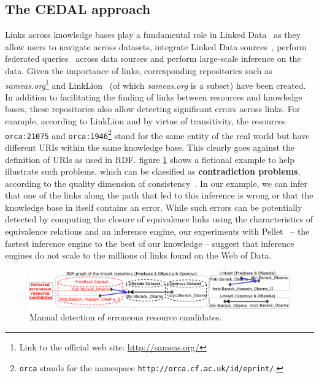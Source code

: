 \subsection{The CEDAL approach}
Links across knowledge bases play a fundamental role in Linked Data~\cite{Albertoni:2013:ALQ:2457317.2457327} as they  allow users to navigate across datasets, integrate Linked Data sources~\cite{NgomoSL14}, perform federated queries~\cite{saleem2013daw} across data sources and perform large-scale inference on the data.
Given the importance of links, corresponding repositories such as \emph{sameas.org}\footnote{Link to the official web site: \url{http://sameas.org/}} and LinkLion~\cite{nentwig2014linklion} (of which \emph{sameas.org} is a subset) have been created. 
In addition to facilitating the finding of links between  resources and knowledge bases, these repositories also allow detecting significant errors across links. 
For example, according to LinkLion and by virtue of transitivity, the resources \texttt{orca:21075} and \texttt{orca:1946}\footnote{\texttt{orca} stands for the namespace \texttt{http://orca.cf.ac.uk/id/eprint/}.} stand for the same entity of the real world but have different URIs within the same knowledge base. 
This clearly goes against the definition of URIs as used in RDF. 
figure \ref{fig:example} shows a fictional example to help illustrate such problems, which can be classified as \textbf{contradiction problems}, according to the quality dimension of consistency~\cite{zaveri2015quality}. 
In our example, we can infer that one of the links along the path that led to this inference is wrong or that the knowledge base in itself contains an error. 
While such errors can be potentially detected by computing the closure of equivalence links using the characteristics of equivalence relations and an inference engine, our experiments with Pellet~\cite{bockbenchmarking} -- the fastest inference engine to the best of our knowledge -- suggest that inference engines do not scale to the millions of links found on the Web of Data. 

\begin{figure}[htb] 
	\centering
	\includegraphics[width=1.0\linewidth]{img/example8.pdf}
	\caption{Manual detection of erroneous resource candidates.}
	\label{fig:example}
\end{figure} 

